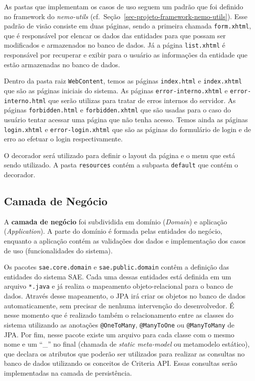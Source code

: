 As pastas que implementam os casos de uso seguem um padrão que foi definido no framework do \textit{nemo-utils} (cf.\ Seção~\ref{sec-projeto-framework-nemo-utils}). Esse padrão de visão consiste em duas páginas, sendo a primeira chamada \texttt{form.xhtml}, que é responsável por elencar os dados das entidades para que possam ser modificados e armazenados no banco de dados. Já a página \texttt{list.xhtml} é responsável por recuperar e exibir para o usuário as informações da entidade que estão armazenadas no banco de dados.


Dentro da pasta raiz \texttt{WebContent}, temos as páginas \texttt{index.html} e \texttt{index.xhtml} que são as páginas iniciais do sistema. As páginas \texttt{error-interno.xhtml} e \texttt{error-interno.html} que serão utilizas para tratar de erros internos do servidor. As páginas \texttt{forbidden.html} e \texttt{forbidden.xhtml} que são usadas para o caso do usuário tentar acessar uma página que não tenha acesso. Temos ainda as páginas \texttt{login.xhtml} e \texttt{error-login.xhtml} que são as páginas do formulário de login e de erro ao efetuar o login respectivamente.



O decorador será utilizado para definir o layout da página e o menu que está sendo utilizado. A pasta \texttt{resources} contém a subpasta \texttt{default} que contém o decorador. 



\subsection{Camada de Negócio}
\label{sec-projeto-arquitetura-sistema-camada-negócio}

A \textbf{camada de negócio} foi subdividida em domínio (\textit{Domain}) e aplicação (\textit{Application}). A parte do domínio é formada pelas entidades do negócio, enquanto a aplicação contém as validações dos dados e implementação dos casos de uso (funcionalidades do sistema).

Os pacotes \texttt{sae.core.domain} e \texttt{sae.public.domain} contêm a definição das entidades do sistema SAE. Cada uma dessas entidades está definida em um arquivo \texttt{*.java} e já realiza o mapeamento objeto-relacional para o banco de dados. Através desse mapeamento, o JPA irá criar os objetos no banco de dados automaticamente, sem precisar de nenhuma intervenção do desenvolvedor. É nesse momento que é realizado também o relacionamento entre as classes do sistema utilizando as anotações \texttt{@OneToMany}, \texttt{@ManyToOne} ou \texttt{@ManyToMany} de JPA. Por fim, nesse pacote existe um arquivo para cada classe com o mesmo nome e um ``\_'' no final (chamada de \textit{static meta-model} ou metamodelo estático), que declara os atributos que poderão ser utilizados para realizar as consultas no banco de dados utilizando os conceitos de Criteria API. Essas consultas serão implementadas na camada de persistência.

